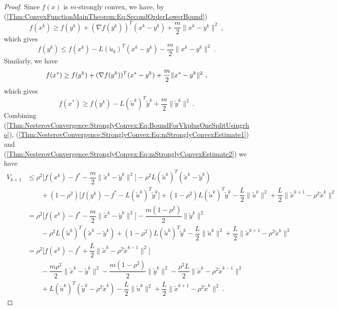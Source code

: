\begin{proof}
Since $f(x)$ is $m$-strongly convex, we have, by (\ref{Thm:ConvexFunctionMainTheorem:Eq:SecondOrderLowerBound})
$$
f(x^k)
\ge
f(y^k)
+
(\nabla f(y^k))^T(x^k-y^k)
+
\frac{m}{2}\|x^k-y^k\|^2 \ ,
$$
which gives 
\begin{equation}\label{Thm:NesterovConvergence:StronglyConvex:Eq:mStronglyConvexEstimate1}
f(y^k)
\le
f(x^k)
-
L (\widetilde{u}_k)^T(x^k-y^k)
-
\frac{m}{2}\|x^k-y^k\|^2 \ .
\end{equation}
Similarly, we have
$$f(x^*)\geq f(y^k) + (\nabla f(y^k))^T (x^*-y^k) + \dfrac{m}{2}\|x^*-y^k\|^2 \ ,
$$
which gives
\begin{equation}\label{Thm:NesterovConvergence:StronglyConvex:Eq:mStronglyConvexEstimate2}
f(x^*)\geq f(y^k) - L(\widetilde{u}^k)^T \widetilde{y}^k + \dfrac{m}{2}\|\widetilde{y}^k\|^2 \ .
\end{equation}
Combining (\ref{Thm:NesterovConvergence:StronglyConvex:Eq:BoundForVkplusOneSplitUsingrho}), (\ref{Thm:NesterovConvergence:StronglyConvex:Eq:mStronglyConvexEstimate1}) and (\ref{Thm:NesterovConvergence:StronglyConvex:Eq:mStronglyConvexEstimate2}) we have
\begin{equation}\label{Thm:NesterovConvergence:StronglyConvex:Eq:EstimateLyapunovJustBforeReducingRk}
\begin{array}{ll}
V_{k+1}
&\le
\rho^2\Big[f(x^k)-f^*-\dfrac{m}{2}\|\tilde x^k-\tilde y^k\|^2\Big]
-\rho^2L(\tilde u^k)^T(\tilde x^k-\tilde y^k) \\
&\qquad
+(1-\rho^2)\Big[f(y^k)-f^*-L(\tilde u^k)^T\tilde y^k\Big]
+(1-\rho^2)L(\tilde u^k)^T \tilde y^k
-\dfrac{L}{2}\|\tilde u^k\|^2
+\dfrac{L}{2}\|\tilde x^{k+1}-\rho^2\tilde x^k\|^2 \\[6pt]
&=
\rho^2\Big[f(x^k)-f^*-\dfrac{m}{2}\|\tilde x^k-\tilde y^k\|^2\Big]
-\dfrac{m(1-\rho^2)}{2}\|\tilde y^k\|^2  \\
&\qquad
-\rho^2L(\tilde u^k)^T(\tilde x^k-\tilde y^k)
+(1-\rho^2)L(\tilde u^k)^T\tilde y^k
-\dfrac{L}{2}\|\tilde u^k\|^2
+\dfrac{L}{2}\|\tilde x^{k+1}-\rho^2\tilde x^k\|^2 \\[6pt]
&=
\rho^2\Big[f(x^k)-f^*
+\dfrac{L}{2}\|\tilde x^k-\rho^2\tilde x^{k-1}\|^2\Big]  \\
&\qquad
-\dfrac{m\rho^2}{2}\|\tilde x^k-\tilde y^k\|^2
-\dfrac{m(1-\rho^2)}{2}\|\tilde y^k\|^2
-\dfrac{\rho^2L}{2}\|\tilde x^k-\rho^2\tilde x^{k-1}\|^2 \\
&\qquad
+L(\tilde u^k)^T(\tilde y^k-\rho^2\tilde x^k)
-\dfrac{L}{2}\|\tilde u^k\|^2
+\dfrac{L}{2}\|\tilde x^{k+1}-\rho^2\tilde x^k\|^2 \ .
\end{array}

\end{equation}
\end{proof}
